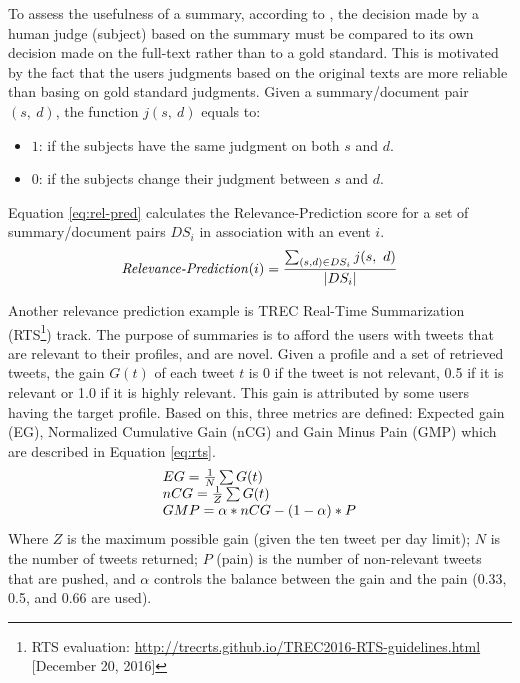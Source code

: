 To assess the usefulness of a summary, according to \citet{05-dorr-al}, the decision made by a human judge (subject) based on the summary must be compared to its own decision made on the full-text rather than to a gold standard.
This is motivated by the fact that the users judgments based on the original texts are more reliable than basing on gold standard judgments.
Given a summary/document pair $ (s,\ d) $, the function $ j(s,\ d) $ equals to:
\begin{itemize}
	\item $ 1 $: if the subjects have the same judgment on both $ s $ and $ d $.
	\item $ 0 $: if the subjects change their judgment between $ s $ and $ d $.
\end{itemize}
Equation \ref{eq:rel-pred} calculates the Relevance-Prediction score for a set of summary/document pairs $ DS_i $ in association with an event $ i $.
\begin{equation}
	\label{eq:rel-pred}
	\text{\textit{Relevance-Prediction}} (i) = \frac{\sum_{(s, d) \in DS_i} j(s,\ d)}{|DS_i|}
\end{equation}

Another relevance prediction example is TREC Real-Time Summarization (RTS\footnote{RTS evaluation: \url{http://trecrts.github.io/TREC2016-RTS-guidelines.html} [December 20, 2016]}) track.
The purpose of summaries is to afford the users with tweets that are relevant to their profiles, and are novel.
Given a profile and a set of retrieved tweets, the gain $ G(t) $ of each tweet $ t $ is 0 if the tweet is not relevant, 0.5 if it is relevant or 1.0 if it is highly relevant.
This gain is attributed by some users having the target profile.
Based on this, three metrics are defined: Expected gain (EG), Normalized Cumulative Gain (nCG) and Gain Minus Pain (GMP) which are described in Equation \ref{eq:rts}.
\begin{equation}
	\label{eq:rts}
	\begin{tabular}{l}
		$ EG = \frac{1}{N} \sum G(t) $ \\
		$ nCG = \frac{1}{Z} \sum G(t) $ \\
		$ GMP = \alpha * nCG - (1- \alpha) * P$
	\end{tabular}
\end{equation}
Where $ Z $ is the maximum possible gain (given the ten tweet per day limit);
$ N $ is the number of tweets returned; 
$ P $ (pain) is the number of non-relevant tweets that are pushed, and $ \alpha $ controls the balance between the gain and the pain (0.33, 0.5, and 0.66 are used). 


